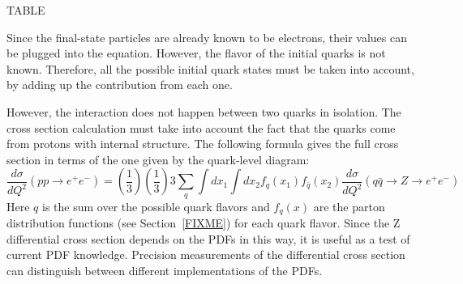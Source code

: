 TABLE

Since the final-state particles are already known to be electrons, 
their values can be plugged into the equation.  
However, the flavor of the initial quarks is not known.  
Therefore, all the possible initial quark states must 
be taken into account, by adding up the contribution from each one.  











However, the interaction does not happen 
between two quarks in isolation.  
The cross section calculation must take 
into account the fact that the quarks come from 
protons with internal structure.  
The following formula gives the full cross section 
in terms of the one given by the quark-level diagram: 
\[
\frac{d \sigma}{d Q^2}(pp \rightarrow e^+ e^- )
= \left( \frac{1}{3} \right) \left( \frac{1}{3} \right) 3 
\sum_q \int dx_1 \int dx_2 f_q (x_1) f_{\bar{q}} (x_2)
\frac{d \sigma }{d Q^2}
( q \bar{q} \rightarrow Z \rightarrow e^+ e^- )
\]
Here $q$ is the sum over the possible quark flavors 
and $f_q(x)$ are the parton distribution functions 
(see Section~\ref{FIXME}) for each quark flavor.  
Since the Z differential cross section depends 
on the PDFs in this way, 
it is useful as a test of current PDF knowledge.  
Precision measurements of the differential cross section 
can distinguish between different implementations 
of the PDFs.  

